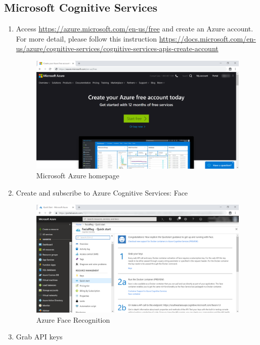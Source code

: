 \tocless\subsection{Microsoft Cognitive Services}
\begin{enumerate}
	\item Access \href{https://azure.microsoft.com/en-us/free}{https://azure.microsoft.com/en-us/free} and create an Azure account. For more detail, please follow this instruction \href{https://docs.microsoft.com/en-us/azure/cognitive-services/cognitive-services-apis-create-account}{https://docs.microsoft.com/en-us/azure/cognitive-services/cognitive-services-apis-create-account}
	      \begin{center}
	      	\begin{figure}[H]
	      		\centering
	      		\includegraphics[width=0.6\columnwidth]{images/appendixA/Azure-homepage.png}
	      		\caption{Microsoft Azure homepage}
	      	\end{figure}
	      \end{center}
	\item Create and subscribe to  Azure Cognitive Services: Face
	      \begin{center}
	      	\begin{figure}[H]
	      		\centering
	      		\includegraphics[width=0.6\columnwidth]{images/appendixA/Azure-subscribe-facial-reg.png}
	      		\caption{Azure Face Recognition}
	      	\end{figure}
	      \end{center}
	\item Grab API keys
\end{enumerate}


